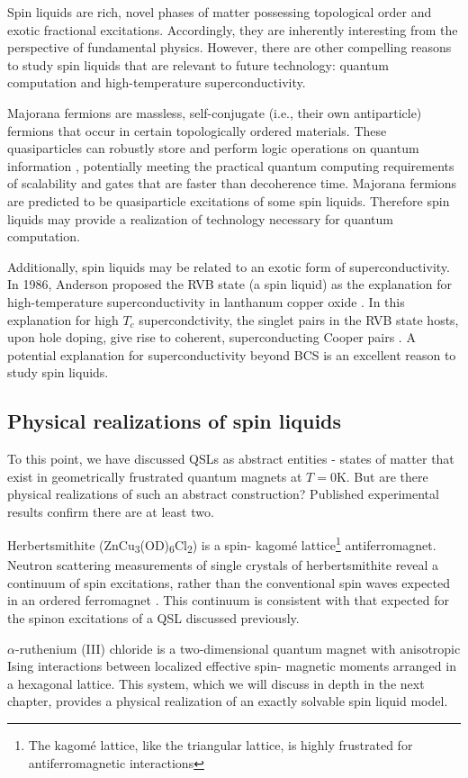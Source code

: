 Spin liquids are rich, novel phases of matter possessing topological order and exotic fractional excitations. Accordingly, they are inherently interesting from the perspective of fundamental physics. However, there are other compelling reasons to study spin liquids that are relevant to future technology: quantum computation and high-temperature superconductivity. 

Majorana fermions are massless, self-conjugate (i.e., their own antiparticle) fermions that occur in certain topologically ordered materials. These quasiparticles can robustly store and perform logic operations on quantum information \cite{Lian2017}, potentially meeting the practical quantum computing requirements of scalability and gates that are faster than decoherence time. Majorana fermions are predicted to be quasiparticle excitations of some spin liquids. Therefore spin liquids may provide a realization of technology necessary for quantum computation.

Additionally, spin liquids may be related to an exotic form of superconductivity. In 1986, Anderson proposed the RVB state (a spin liquid) as the explanation for high-temperature superconductivity in lanthanum copper oxide \cite{Anderson1986}. In this explanation for high $T_{c}$ supercondctivity, the singlet pairs in the RVB state hosts, upon hole doping, give rise to coherent, superconducting Cooper pairs  \cite{Chen2018}. A potential explanation for superconductivity beyond BCS is an excellent reason to study spin liquids.

\subsection{Physical realizations of spin liquids}

To this point, we have discussed QSLs as abstract entities - states of matter that exist in geometrically frustrated quantum magnets at $T = 0$K. But are there physical realizations of such an abstract construction? Published experimental results confirm there are at least two.

Herbertsmithite (ZnCu\textsubscript{3}(OD)\textsubscript{6}Cl\textsubscript{2}) is a spin-\textonehalf{} kagom\'{e}{} lattice\footnote{The kagom\'{e} lattice, like the triangular lattice, is highly frustrated for antiferromagnetic interactions} antiferromagnet. Neutron scattering measurements of single crystals of herbertsmithite reveal a continuum of spin excitations, rather than the conventional spin waves expected in an ordered ferromagnet \cite{Han2012}. This continuum is consistent with that expected for the spinon excitations of a QSL discussed previously.

$\alpha$-ruthenium (III) chloride is a two-dimensional quantum magnet with anisotropic Ising interactions between localized effective spin-\textonehalf{} magnetic moments arranged in a hexagonal lattice. This system, which we will discuss in depth in the next chapter, provides a physical realization of an exactly solvable spin liquid model.